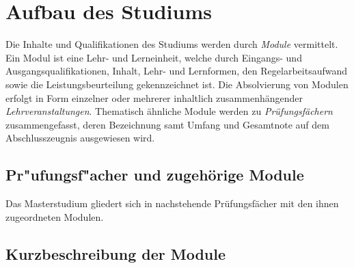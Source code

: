 %
\newcommand*\Deutsch[1][B2]{%
  Für einen erfolgreichen Studienfortgang werden Deutschkenntnisse
  nach Referenzniveau #1 des Gemeinsamen Europäischen
  Referenzrahmens für Sprachen empfohlen.%
}%
\newcommand*\Englisch{
  \par
  In einzelnen Lehrveranstaltungen kann der Vortrag in englischer
  Sprache stattfinden bzw.\ können die Unterlagen in englischer
  Sprache vorliegen. Daher werden Englischkenntnisse auf
  Referenzniveau B1 des Gemeinsamen Europäischen Referenzrahmens für
  Sprachen empfohlen.%
}%

%


\section{Aufbau des Studiums}\label{sec:AS}

Die Inhalte und Qualifikationen des Studiums werden durch
\emph{Module} vermittelt. Ein Modul ist eine Lehr- und Lerneinheit,
welche durch Eingangs- und Ausgangsqualifikationen, Inhalt, Lehr- und
Lernformen, den Regelarbeitsaufwand sowie die Leistungsbeurteilung
gekennzeichnet ist. Die Absolvierung von Modulen erfolgt in Form
einzelner oder mehrerer inhaltlich zusammenhängender
\emph{Lehrveranstaltungen}.  Thematisch ähnliche Module werden zu
\emph{Prüfungsfächern} zusammengefasst, deren Bezeichnung samt 
Umfang und Gesamtnote auf dem Abschlusszeugnis ausgewiesen wird.

\subsection*{Pr"ufungsf"acher und zugehörige Module}

Das Masterstudium \emph{} gliedert sich in 
nachstehende Prüfungsfächer mit den ihnen zugeordneten Modulen.

\subsection*{Kurzbeschreibung der Module}

